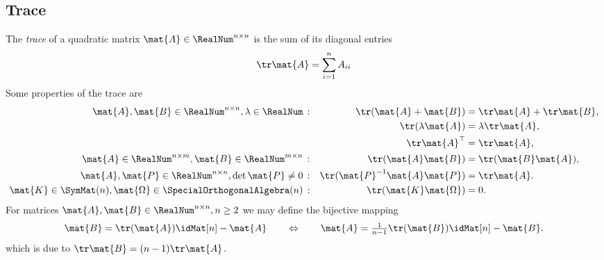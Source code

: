 \subsection{Trace}
The \textit{trace} of a quadratic matrix $\mat{A} \in \RealNum^{n\times n}$ is the sum of its diagonal entries
\begin{align}
 \tr \mat{A} = \sum_{i=1}^{n} A_{ii}
\end{align}
Some properties of the trace are
\begin{subequations}
\begin{align}
 \mat{A}, \mat{B} \in \RealNum^{n\times n}, \lambda\in\RealNum \,&:&
 \tr(\mat{A}+\mat{B}) &= \tr\mat{A} + \tr\mat{B},
\\
 &&
 \tr(\lambda \mat{A}) &= \lambda \tr\mat{A},
\\
 &&
 \tr \mat{A}^\top &= \tr \mat{A},
\\ 
 \mat{A} \in \RealNum^{n\times m}, \mat{B}\in\RealNum^{m\times n}\,&:&
 \tr(\mat{A}\mat{B}) &= \tr(\mat{B}\mat{A}),
\\ 
 \mat{A}, \mat{P} \in \RealNum^{n\times n}, \det\mat{P} \neq 0\,&:&
 \tr(\mat{P}^{-1} \mat{A} \mat{P}) &= \tr\mat{A}.
\\
 \mat{K}\in\SymMat(n), \mat{\Omega}\in\SpecialOrthogonalAlgebra(n)\,&:&
 \tr(\mat{K}\mat{\Omega}) &= 0.
\end{align}
\end{subequations}
For matrices $\mat{A},\mat{B}\in \RealNum^{n\times n}, n\geq2$ we may define the bijective mapping
\begin{align}
 \mat{B} = \tr(\mat{A})\idMat[n] - \mat{A}
\qquad \Leftrightarrow \qquad
 \mat{A} = \tfrac{1}{n-1}\tr(\mat{B}) \idMat[n] - \mat{B}.
\end{align}
which is due to $\tr\mat{B} = (n-1)\tr\mat{A}$.


